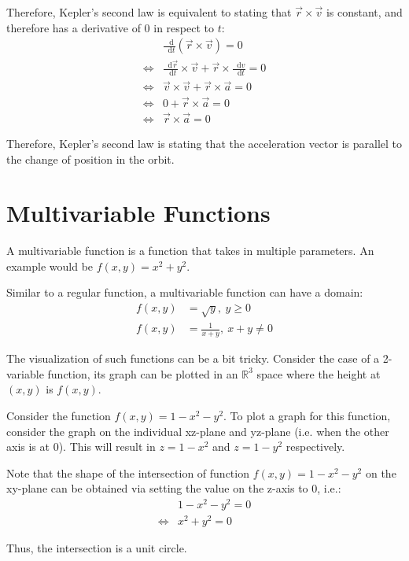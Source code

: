 \documentclass[12pt]{article}
\newcommand{\RR}{\mathbb{R}}
\newcommand*\diff{\mathop{}\!\mathrm{d}}
\theoremstyle{definition}
\begin{document}
	Therefore, Kepler's second law is equivalent to stating that $\vec{r} \times \vec{v}$ is constant, and therefore has a derivative of $0$ in respect to $t$:
	\begin{align*}
		&\frac{\diff}{\diff t} (\vec{r} \times \vec{v}) = 0 \\
		\iff &\frac{\diff \vec{r}}{\diff t} \times \vec{v} + \vec{r} \times \frac{\diff v}{\diff t} = 0 \\
		\iff &\vec{v} \times \vec{v} + \vec{r} \times \vec{a} = 0 \\
		\iff &0 + \vec{r} \times \vec{a} = 0 \\
		\iff &\vec{r} \times \vec{a} = 0
	\end{align*}
	
	Therefore, Kepler's second law is stating that the acceleration vector is parallel to the change of position in the orbit.
	
	\section{Multivariable Functions}
	
	A multivariable function is a function that takes in multiple parameters. An example would be $f(x, y) = x^2 + y^2$.
	
	Similar to a regular function, a multivariable function can have a domain:
	\begin{align*}
		f(x, y) &= \sqrt{y},\ y \geq 0 \\
		f(x, y) &= \frac{1}{x + y},\ x + y \neq 0
	\end{align*}
	
	The visualization of such functions can be a bit tricky. Consider the case of a 2-variable function, its graph can be plotted in an $\RR^3$ space where the height at $(x, y)$ is $f(x, y)$.
	
	Consider the function $f(x, y) = 1 - x^2 - y^2$. To plot a graph for this function, consider the graph on the individual xz-plane and yz-plane (i.e. when the other axis is at $0$). This will result in $z = 1 - x^2$ and $z = 1 - y^2$ respectively.
	
	Note that the shape of the intersection of function $f(x, y) = 1 - x^2 - y^2$ on the xy-plane can be obtained via setting the value on the z-axis to $0$, i.e.:
	\begin{align*}
		&1 - x^2 - y^2 = 0 \\
		\iff &x^2 + y^2 = 0
	\end{align*}
	
	Thus, the intersection is a unit circle.
	
\end{document}
